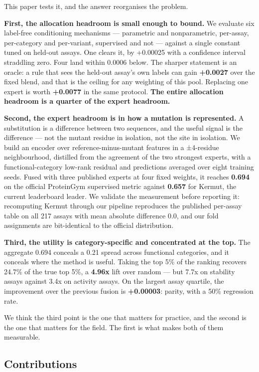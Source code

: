 \documentclass[sigconf,review,nonacm]{acmart}
\begin{document}
This paper tests it, and the answer reorganises the problem.

\textbf{First, the allocation headroom is small enough to bound.} We evaluate six label-free conditioning
mechanisms --- parametric and nonparametric, per-assay, per-category and per-variant, supervised and not ---
against a single constant tuned on held-out assays. One clears it, by +0.00025 with a confidence
interval straddling zero. Four land within 0.0006 below. The sharper statement is an oracle: a rule that
sees the held-out assay's own labels can gain \textbf{+0.0027} over the fixed blend, and that is the ceiling
for any weighting of this pool. Replacing one expert is worth \textbf{+0.0077} in the same protocol. \textbf{The
entire allocation headroom is a quarter of the expert headroom.}

\textbf{Second, the expert headroom is in how a mutation is represented.} A substitution is a difference
between two sequences, and the useful signal is the difference --- not the mutant residue in isolation, not
the site in isolation. We build an encoder over reference-minus-mutant features in a ±4-residue
neighbourhood, distilled from the agreement of the two strongest experts, with a functional-category
low-rank residual and predictions averaged over eight training seeds. Fused with three published experts
at four fixed weights, it reaches \textbf{0.694} on the official ProteinGym supervised metric against
\textbf{0.657} for Kermut, the current leaderboard leader. We validate the measurement before reporting it:
recomputing Kermut through our pipeline reproduces the published per-assay table on all 217 assays with
mean absolute difference 0.0, and our fold assignments are bit-identical to the official distribution.

\textbf{Third, the utility is category-specific and concentrated at the top.} The aggregate 0.694 conceals
a 0.21 spread across functional categories, and it conceals where the method is useful. Taking the top
5\% of the ranking recovers 24.7\% of the true top 5\%, a \textbf{4.96x} lift over random --- but 7.7x on
stability assays against 3.4x on activity assays. On the largest assay quartile, the improvement over
the previous fusion is \textbf{+0.00003}: parity, with a 50\% regression rate.

We think the third point is the one that matters for practice, and the second is the one that matters
for the field. The first is what makes both of them measurable.

\subsection*{Contributions}\label{contributions}
\end{document}
